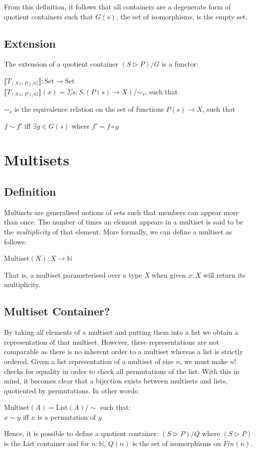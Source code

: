 \documentclass[12pt]{report}
\begin{document}
 From this definition, it follows that all containers are a degenerate form of quotient containers such that $G(s)$, the set of isomorphisms, is the empty set. 

\section{Extension}
The extension of a quotient container $(S \rhd P)/G$ is a functor:
\begin{center}
$\llbracket T_{(S \rhd P)/G}\rrbracket : \text{Set} \rightarrow \text{Set}$\\
$\llbracket T_{(S \rhd P)/G}\rrbracket(x) = \Sigma s:S.(P(s) \rightarrow X)/\sim_{s}$, such that\\
\end{center}
$\sim_{s}$ is the equivalence relation on the set of functions $P(s) \rightarrow X$, such that
\begin{center}
$f \sim f'$ iff $\exists g \in G(s)$ where $f' = f \circ g$
\end{center}

\chapter{Multisets}
\section{Definition}
Multisets are generalised notions of sets such that members can appear more than once. The number of times an element appears in a multiset is said to be the \textit{multiplicity} of that element. More formally, we can define a multiset as follows:
\begin{center}
$\text{Multiset}(X) : X \to \mathbb{N}$ 
\end{center}
That is, a multiset parameterised over a type \textit{X} when given $x:X$ will return its multiplicity. 
\section{Multiset Container?}
By taking all elements of a multiset and putting them into a list we obtain a representation of that multiset. However, these representations are not comparable as there is no inherent order to a multiset whereas a list is strictly ordered. Given a list representation of a multiset of size $n$, we must make $n!$ checks for equality in order to check all permutations of the list. With this in mind, it becomes clear that a bijection exists between multisets and lists, quotiented by permutations. In other words:
\begin{center}
$\text{Multiset}(A) = \text{List}(A)/\sim$ such that:\\
$x \sim y$ iff $x$ is a permutation of $y$
\end{center}
Hence, it is possible to define a quotient container: $(S \rhd P)/Q$ where $(S \rhd P)$ is the List container and for $n:\mathbb{N}$, $Q(n)$ is the set of isomorphisms on $Fin(n)$.
\end{document}
